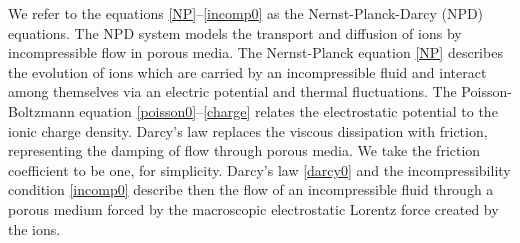 \documentclass[10pt,twoside,reqno]{amsart}
\numberwithin{figure}{section}
\numberwithin{equation}{section}
\theoremstyle{definition}
\newcommand{\1}{\mathbbm{1}}
\begin{document}
We refer to the equations \eqref{NP}--\eqref{incomp0} as the Nernst-Planck-Darcy (NPD) equations. The NPD system models the transport and diffusion of ions by incompressible flow in porous media. The Nernst-Planck equation \eqref{NP} describes the evolution of ions which are carried by an incompressible fluid and interact among themselves via an electric potential and thermal fluctuations. The Poisson-Boltzmann equation \eqref{poisson0}--\eqref{charge} relates the electrostatic potential to the ionic charge density. Darcy's law replaces the viscous dissipation with friction, representing the damping of flow through porous media. We take the friction coefficient to be one, for simplicity. Darcy's law \eqref{darcy0} and the incompressibility condition \eqref{incomp0} describe then the flow of an incompressible fluid through a porous medium forced by the macroscopic electrostatic Lorentz force created by the ions.
\end{document}
